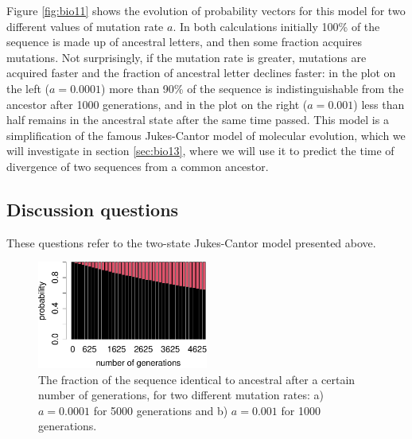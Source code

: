 \documentclass[
  letterpaper,
  DIV=11,
  numbers=noendperiod]{scrreprt}
\begin{document}
Figure \ref{fig:bio11} shows the evolution of probability vectors for
this model for two different values of mutation rate \(a\). In both
calculations initially 100\% of the sequence is made up of ancestral
letters, and then some fraction acquires mutations. Not surprisingly, if
the mutation rate is greater, mutations are acquired faster and the
fraction of ancestral letter declines faster: in the plot on the left
(\(a=0.0001\)) more than 90\% of the sequence is indistinguishable from
the ancestor after 1000 generations, and in the plot on the right
(\(a=0.001\)) less than half remains in the ancestral state after the
same time passed. This model is a simplification of the famous
Jukes-Cantor model of molecular evolution, which we will investigate in
section \ref{sec:bio13}, where we will use it to predict the time of
divergence of two sequences from a common ancestor.

\hypertarget{discussion-questions-5}{%
\subsection{Discussion questions}\label{discussion-questions-5}}

These questions refer to the two-state Jukes-Cantor model presented
above.

\begin{figure}

{\centering \includegraphics[width=0.5\textwidth,height=\textheight]{./markov_evol_files/figure-pdf/bio11-1.pdf}

}

\caption{The fraction of the sequence identical to ancestral after a
certain number of generations, for two different mutation rates: a)
\(a=0.0001\) for 5000 generations and b) \(a=0.001\) for 1000
generations.}

\end{figure}
\end{document}
